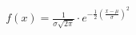 \documentclass[preview]{standalone}
\begin{document}
\begin{align*}
f(x) = \frac{1}{\sigma\sqrt{2\pi}} \cdot e^{-\frac{1}{2}\left(\frac{x - \mu}{\sigma}\right)^2}
\end{align*}
\end{document}

